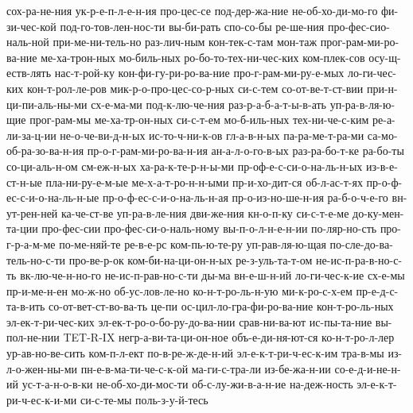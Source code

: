 {    сох-ра-не-ния
    ук-р-е-п-л-е-н-ия
    про-цес-се
    под-дер-жа-ние
    не-об-хо-ди-мо-го
    фи-зи-чес-кой
    под-го-тов-лен-нос-ти
    вы-би-рать
    спо-со-бы
    ре-ше-ния
    про-фес-сио-наль-ной
    при-ме-ни-тель-но
    раз-лич-ным
    кон-тек-с-там
    мон-таж
    прог-рам-ми-ро-ва-ние
    ме-ха-трон-ных
    мо-биль-ных
    ро-бо-то-тех-ни-чес-ких
    ком-плек-сов
    осу-щ-еств-лять
    нас-т-рой-ку
    кон-фи-гу-ри-ро-ва-ние
    про-г-рам-ми-ру-е-мых
    ло-ги-чес-ких
    кон-т-рол-ле-ров
    мик-р-о-про-цес-со-р-ных
    си-с-тем
    со-от-ве-т-ст-вии
    при-н-ци-пи-аль-ны-ми
    сх-е-ма-ми
    под-к-лю-че-ния
    раз-р-а-б-а-т-ы-в-ать
    уп-ра-в-ля-ю-щие
    прог-рам-мы
    ме-ха-тр-он-ных
    си-с-т-ем
    мо-б-иль-ных
    тех-ни-че-с-ким
    ре-а-ли-за-ц-ии
    не-о-че-ви-д-н-ых
    ис-то-ч-ни-к-ов
    гл-а-в-н-ых
    па-ра-ме-т-ра-ми
    са-мо-об-ра-зо-ва-н-ия
    пр-о-г-рам-ми-ро-ва-н-ия
    ан-а-л-о-го-в-ых
    раз-ра-бо-т-ке
    ра-бо-ты
    со-ци-аль-н-ом
    см-еж-н-ых
    ха-ра-к-те-р-н-ы-ми
    пр-оф-е-с-си-о-на-ль-н-ых
    из-в-е-ст-н-ые
    пла-ни-ру-е-м-ые
    ме-х-а-т-ро-н-н-ыми
    пр-и-хо-дит-ся
    об-л-ас-т-ях
    пр-о-ф-ес-с-и-о-на-ль-н-ые
    пр-о-ф-ес-с-и-о-на-ль-н-ая
    пр-о-из-но-ше-н-ия
    ра-б-о-ч-е-го
    вн-ут-рен-ней
    ка-че-ст-ве
    уп-ра-в-ле-ния
    дви-же-ния
    кн-о-п-ку
    си-с-т-е-ме
    до-ку-мен-та-ции
    про-фес-сии
    про-фес-си-о-наль-ному
    вы-п-о-л-н-е-н-ии
    по-ляр-но-сть
    про-г-р-а-м-ме
    по-ме-няй-те
    ре-в-е-рс
    ком-пь-ю-те-ру
    уп-рав-ля-ю-щая
    по-сле-до-ва-тель-но-с-ти
    про-ве-р-ок
    ком-би-на-ци-он-н-ых
    ре-з-уль-та-т-ом
    не-ис-п-ра-в-но-с-ть
    вк-лю-че-н-но-го
    не-ис-п-рав-но-с-ти
    ды-ма
    вн-е-ш-н-ий
    ло-ги-чес-к-ие
    сх-е-мы
    пр-и-ме-н-ен
    мо-ж-но
    об-ус-лов-ле-но
    ко-н-т-ро-ль-н-ую
    ми-к-ро-с-х-ем
    пр-е-д-с-та-в-ить
    со-от-вет-ст-во-ва-ть
    це-пи
    ос-цил-ло-гра-фи-ро-ва-ние
    кон-т-ро-ль-ных
    эл-ек-т-ри-чес-ких
    эл-ек-т-ро-о-бо-ру-до-ва-нии
    срав-ни-ва-ют
    ис-пы-та-ние
    вы-пол-не-нии
    TET-R-IX
    негр-а-ви-та-ци-он-ное
    объ-е-ди-ня-ют-ся
    ко-н-т-ро-л-лер
    ур-ав-но-ве-сить
    ком-п-л-ект
    по-в-ре-ж-де-н-ий
    эл-е-к-т-ри-ч-ес-к-им
    тра-в-мы
    из-л-о-жен-ны-ми
    пн-е-в-ма-ти-че-с-к-ой
    ма-ги-с-тра-ли
    из-бе-жа-н-ии
    со-е-д-и-не-н-ий
    ус-т-а-н-о-в-ки
    не-об-хо-ди-мос-ти
    об-с-лу-жи-в-а-н-ие
    на-деж-ность
    эл-е-к-т-ри-ч-ес-к-и-ми
    си-с-те-мы
    поль-з-у-й-тесь
    }